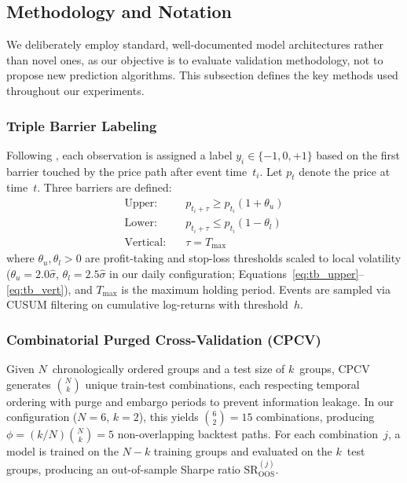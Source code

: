 \documentclass[preprint,12pt,authoryear]{elsarticle}
\begin{document}
\subsection{Methodology and Notation}

We deliberately employ standard, well-documented model architectures rather than novel ones, as our objective is to evaluate validation methodology, not to propose new prediction algorithms. This subsection defines the key methods used throughout our experiments.

\subsubsection{Triple Barrier Labeling}
Following \citet{lopezdeprado2018advances}, each observation is assigned a label $y_i \in \{-1, 0, +1\}$ based on the first barrier touched by the price path after event time~$t_i$. Let $p_t$ denote the price at time~$t$. Three barriers are defined:
\begin{align}
\text{Upper:} \quad & p_{t_i + \tau} \geq p_{t_i}(1 + \theta_u) \label{eq:tb_upper} \\
\text{Lower:} \quad & p_{t_i + \tau} \leq p_{t_i}(1 - \theta_l) \label{eq:tb_lower} \\
\text{Vertical:} \quad & \tau = T_{\max} \label{eq:tb_vert}
\end{align}
where $\theta_u, \theta_l > 0$ are profit-taking and stop-loss thresholds scaled to local volatility ($\theta_u = 2.0\hat{\sigma}$, $\theta_l = 2.5\hat{\sigma}$ in our daily configuration; Equations~\ref{eq:tb_upper}--\ref{eq:tb_vert}), and $T_{\max}$ is the maximum holding period. Events are sampled via CUSUM filtering on cumulative log-returns with threshold~$h$.

\subsubsection{Combinatorial Purged Cross-Validation (CPCV)}
Given $N$~chronologically ordered groups and a test size of $k$~groups, CPCV generates $\binom{N}{k}$ unique train-test combinations, each respecting temporal ordering with purge and embargo periods to prevent information leakage. In our configuration ($N = 6$, $k = 2$), this yields $\binom{6}{2} = 15$ combinations, producing $\phi = (k/N)\binom{N}{k} = 5$ non-overlapping backtest paths. For each combination~$j$, a model is trained on the $N - k$ training groups and evaluated on the $k$~test groups, producing an out-of-sample Sharpe ratio $\mathrm{SR}_{\mathrm{OOS}}^{(j)}$.
\end{document}
